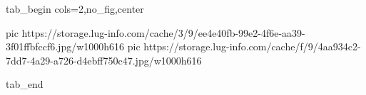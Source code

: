  
 
 
 
 


\ifcmt
  tab_begin cols=2,no_fig,center

     pic https://storage.lug-info.com/cache/3/9/ee4e40fb-99e2-4f6e-aa39-3f01ffbfccf6.jpg/w1000h616
		 pic https://storage.lug-info.com/cache/f/9/4aa934c2-7dd7-4a29-a726-d4ebff750c47.jpg/w1000h616

  tab_end
\fi
